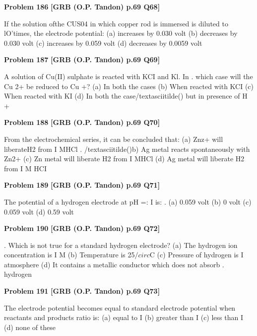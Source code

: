 \begin{problembox}
\textbf{Problem 186} \hfill \textbf{[GRB (O.P. Tandon) p.69 Q68]}
\label{q:ext-grb_all_questions-186}

If the solution ofthe CUS04 in which copper rod is immersed 
is diluted to lO'times, the electrode potential: 
(a) increases by 0.030 volt 
(b) decreases by 0.030 volt 
(c) increases by 0.059 volt 
(d) decreases by 0.0059 volt
\end{problembox}

\begin{problembox}
\textbf{Problem 187} \hfill \textbf{[GRB (O.P. Tandon) p.69 Q69]}
\label{q:ext-grb_all_questions-187}

A solution of Cu(II) sulphate is reacted with KCI and Kl. In 
. which case will the Cu 2+ be reduced to Cu +? 
(a) In both the cases 
(b) When reacted with KCI 
(c) When reacted with KI 
(d) In both the case/textasciitilde() but in presence of H +
\end{problembox}

\begin{problembox}
\textbf{Problem 188} \hfill \textbf{[GRB (O.P. Tandon) p.69 Q70]}
\label{q:ext-grb_all_questions-188}

From the electrochemical series, it can be concluded that: 
(a) Znz+ will liberateH2 from I MHCl 
. 
/textasciitilde()b) Ag metal reacts spontaneously with Zn2+ 
(c) Zn metal will liberate H2 from I MHCl 
(d) Ag metal will liberate H2 from I M HCI
\end{problembox}

\begin{problembox}
\textbf{Problem 189} \hfill \textbf{[GRB (O.P. Tandon) p.69 Q71]}
\label{q:ext-grb_all_questions-189}

The potential of a hydrogen electrode at pH =: I is: 
. (a) 0.059 volt 
(b) 0 volt 
(c) 
0.059 volt 
(d) 0.59 volt
\end{problembox}

\begin{problembox}
\textbf{Problem 190} \hfill \textbf{[GRB (O.P. Tandon) p.69 Q72]}
\label{q:ext-grb_all_questions-190}

. Which is not true for a standard hydrogen electrode? 
(a) The hydrogen ion concentration is I M 
(b) Temperature is 25$/circ$C 
(c) Pressure of hydrogen is I atmosphere 
(d) It contains a metallic conductor which does not absorb 
. hydrogen
\end{problembox}

\begin{problembox}
\textbf{Problem 191} \hfill \textbf{[GRB (O.P. Tandon) p.69 Q73]}
\label{q:ext-grb_all_questions-191}

The electrode potential becomes equal to standard electrode 
potential when reactants and products ratio is: 
(a) equal to I 
(b) greater than I 
(c) less than I 
(d) none of these
\end{problembox}

